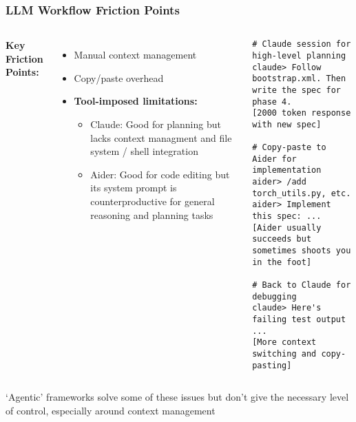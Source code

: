 \documentclass{beamer}
\begin{document}
\begin{frame}[fragile]
\frametitle{LLM Workflow Friction Points}

\begin{columns}
\textbf{Key Friction Points:}
\begin{itemize}
\item Manual context management
\item Copy/paste overhead
\item \textbf{Tool-imposed limitations:} 
   \begin{itemize}
      \item Claude: Good for planning but lacks context managment and file system / shell integration
      \item Aider: Good for code editing but its system prompt is counterproductive for general reasoning and planning tasks
   \end{itemize}
\end{itemize}

\begin{lstlisting}[basicstyle=\ttfamily\tiny]
# Claude session for high-level planning
claude> Follow bootstrap.xml. Then write the spec for phase 4.
[2000 token response with new spec]

# Copy-paste to Aider for implementation
aider> /add torch_utils.py, etc.
aider> Implement this spec: ...
[Aider usually succeeds but sometimes shoots you in the foot]

# Back to Claude for debugging
claude> Here's failing test output ...
[More context switching and copy-pasting]
\end{lstlisting}
\end{columns}

\vspace{0.2cm}
\centering
`Agentic' frameworks solve some of these issues but don't give the necessary level of control, especially around context management
\end{frame}
\end{document}
